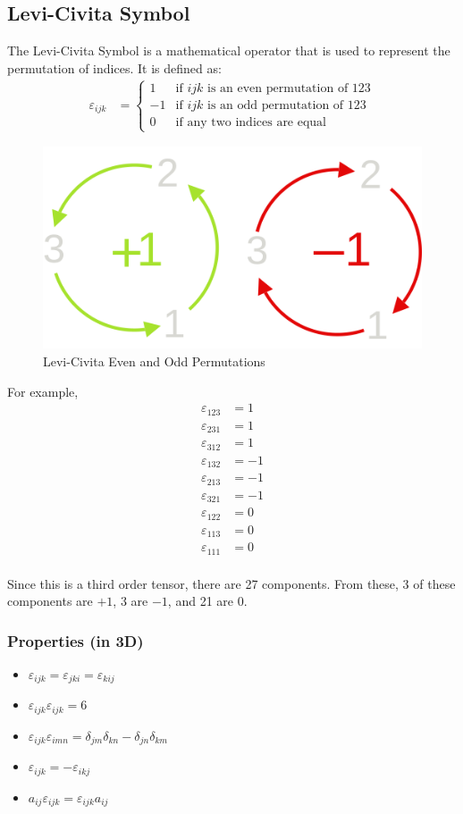 \subsection{Levi-Civita Symbol}
The Levi-Civita Symbol is a mathematical operator that is used to represent the permutation of indices. It is defined as:
\begin{align*}
    \varepsilon_{ijk} &= 
    \begin{cases}
        1 & \text{if } ijk \text{ is an even permutation of } 123 \\
        -1 & \text{if } ijk \text{ is an odd permutation of } 123 \\
        0 & \text{if any two indices are equal}
    \end{cases}
\end{align*}
\begin{figure}[H]
    \centering
    \includegraphics[width=0.5\linewidth]{Section/Figures/levi-civita-cycle-permutation.png}
    \caption{Levi-Civita Even and Odd Permutations}
\end{figure}

For example,
\begin{align*}
    \varepsilon_{123} &= 1 \\
    \varepsilon_{231} &= 1 \\
    \varepsilon_{312} &= 1 \\
    \varepsilon_{132} &= -1 \\
    \varepsilon_{213} &= -1 \\
    \varepsilon_{321} &= -1 \\
    \varepsilon_{122} &= 0 \\
    \varepsilon_{113} &= 0 \\
    \varepsilon_{111} &= 0 \\
\end{align*}

Since this is a third order tensor, there are 27 components. From these, 3 of these components are $+1$, 3 are $-1$, and 21 are $0$.

\subsubsection{Properties (in 3D)}
\begin{itemize}
    \item $\varepsilon_{ijk} = \varepsilon_{jki} = \varepsilon_{kij}$
    \item $\varepsilon_{ijk}\varepsilon_{ijk} = 6$
    \item $\varepsilon_{ijk}\varepsilon_{imn} = \delta_{jm}\delta_{kn} - \delta_{jn}\delta_{km}$
    \item $\varepsilon_{ijk} = -\varepsilon_{ikj}$
    \item $a_{ij}\varepsilon_{ijk} = \varepsilon_{ijk}a_{ij}$
\end{itemize}

